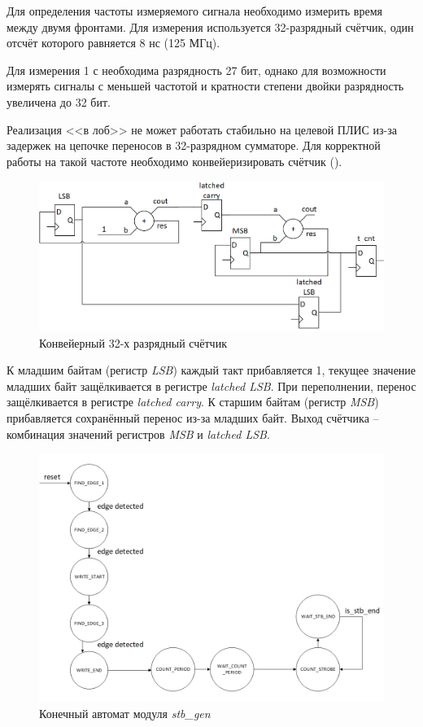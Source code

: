 Для определения частоты измеряемого сигнала необходимо измерить время между двумя фронтами.
Для измерения используется 32-разрядный счётчик, один отсчёт которого равняется 8 нс (125 МГц).

Для измерения 1 с необходима разрядность 27 бит, однако для возможности измерять сигналы с меньшей частотой 
и кратности степени двойки разрядность увеличена до 32 бит.

Реализация <<в лоб>> не может работать стабильно на целевой ПЛИС из-за задержек на цепочке переносов в 
32-разрядном сумматоре. Для корректной работы на такой частоте необходимо конвейеризировать счётчик ().

\begin{figure}[ht!] 
	\center
	\includegraphics [scale=0.7] {my_folder/images//t_cnt}
	\caption{Конвейерный 32-х разрядный счётчик} 
	\label{fig:t-cnt}  
\end{figure}

К младшим байтам (регистр \emph{LSB}) каждый такт прибавляется 1, текущее значение младших байт защёлкивается в регистре \emph{latched LSB}.
При переполнении, перенос защёлкивается в регистре \emph{latched carry}. К старшим байтам (регистр \emph{MSB}) прибавляется сохранённый перенос из-за
младших байт. Выход счётчика -- комбинация значений регистров \emph{MSB} и \emph{latched LSB}.


\lstset{
	numbersep = 5pt,
	stepnumber = 1
}


\begin{figure}[ht!] 
	\center
	\includegraphics [scale=0.7] {my_folder/images//stb_gen_fsm}
	\caption{Конечный автомат модуля \emph{stb\_gen}} 
	\label{fig:stb-gen-fsm}  
\end{figure}


